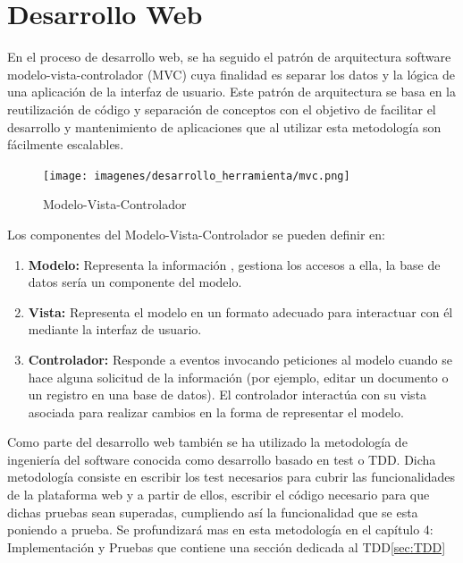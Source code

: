 \documentclass[a4paper,11pt]{book}
\begin{document}
\section{Desarrollo Web}

En el proceso de desarrollo web, se ha seguido el patrón de arquitectura software modelo-vista-controlador (MVC)\cite{mvc} cuya finalidad es separar los datos y la lógica de una aplicación de la interfaz de usuario. Este patrón de arquitectura se basa en la reutilización de código y separación de conceptos con el objetivo de facilitar el desarrollo y mantenimiento de aplicaciones que al utilizar esta metodología son fácilmente escalables. 

\begin{figure}[H] 
\centering 
\texttt{[image: imagenes/desarrollo\_herramienta/mvc.png]}
\caption{ Modelo-Vista-Controlador\cite{mvc2}  }  
\end{figure} 

Los componentes\cite{mvc3}\cite{mvc4} del Modelo-Vista-Controlador se pueden definir en:

\begin{enumerate}
\item \textbf{Modelo:} Representa la información , gestiona los accesos a ella, la base de datos sería un componente del modelo. 

\item \textbf{Vista:} Representa el modelo en un formato adecuado para interactuar con él mediante la interfaz de usuario.  

\item \textbf{Controlador:} Responde a eventos invocando peticiones al modelo cuando se hace alguna solicitud de la información (por ejemplo, editar un documento o un registro en una base de datos). El controlador interactúa con su vista asociada para realizar cambios en la forma de representar el modelo. 
\end{enumerate}


Como parte del desarrollo web también se ha utilizado la metodología de ingeniería del software conocida como desarrollo basado en test o TDD. Dicha metodología consiste en escribir los test necesarios para cubrir las funcionalidades de la plataforma web y a partir de ellos, escribir el código necesario para que dichas pruebas sean superadas, cumpliendo así la funcionalidad que se esta poniendo a prueba.  Se profundizará mas en esta metodología en el capítulo 4: Implementación y Pruebas que contiene una sección dedicada al TDD\ref{sec:TDD}
\end{document}

